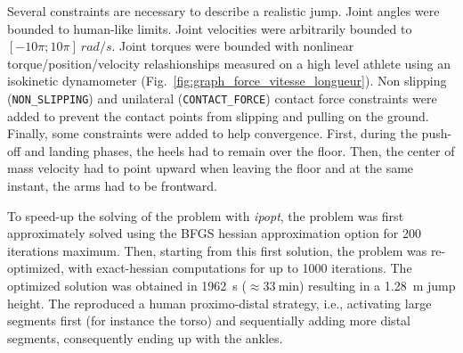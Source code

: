 
Several constraints are necessary to describe a realistic jump.
Joint angles were bounded to human-like limits.
Joint velocities were arbitrarily bounded to $[-10 \pi; 10 \pi]~ rad/s$.
Joint torques were bounded with nonlinear torque/position/velocity relashionships measured on a high level athlete using an isokinetic dynamometer (Fig.~\ref{fig:graph_force_vitesse_longueur}). 
Non slipping (\texttt{NON\_SLIPPING}) and unilateral (\texttt{CONTACT\_FORCE}) contact force constraints were added to prevent the contact points from slipping and pulling on the ground.
Finally, some constraints were added to help convergence.
First, during the push-off and landing phases, the heels had to remain over the floor.
Then, the center of mass velocity had to point upward when leaving the floor and at the same instant, the arms had to be frontward. 

To speed-up the solving of the problem with \emph{ipopt}, the problem was first approximately solved using the BFGS hessian approximation option for 200 iterations maximum.
Then, starting from this first solution, the problem was re-optimized, with exact-hessian computations for up to 1000 iterations.
The optimized solution was obtained in \SI{1962}{\second} ($\approx\SI{33}{\minute}$) resulting in a \SI{1.28}{\meter} jump height.
The  reproduced a human proximo-distal strategy, i.e., activating large segments first (for instance the torso) and sequentially adding more distal segments, consequently ending up with the ankles.

